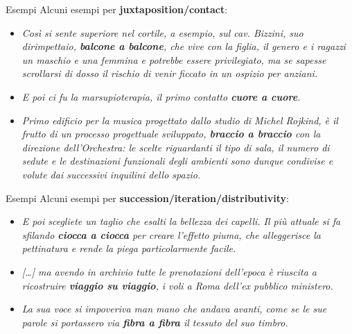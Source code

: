 \documentclass{beamer}
\begin{document}
\begin{frame}{Esempi}
    Alcuni esempi per \textbf{juxtaposition/contact}:
    
    \begin{itemize}
        \item \textit{Così si sente superiore nel cortile, a esempio, sul cav. Bizzini, suo dirimpettaio, \textbf{balcone a balcone}, che vive con la figlia, il genero e i ragazzi un maschio e una femmina e potrebbe essere privilegiato, ma se sapesse scrollarsi di dosso il rischio di venir ficcato in un ospizio per anziani.}
        \item \textit{E poi ci fu la marsupioterapia, il primo contatto \textbf{cuore a cuore}.}
        \item \textit{Primo edificio per la musica progettato dallo studio di Michel Rojkind, è il frutto di un processo progettuale sviluppato, \textbf{braccio a braccio} con la direzione dell'Orchestra: le scelte riguardanti il tipo di sala, il numero di sedute e le destinazioni funzionali degli ambienti sono dunque condivise e volute dai successivi inquilini dello spazio.}
    \end{itemize}
\end{frame}

\begin{frame}{Esempi}
    Alcuni esempi per \textbf{succession/iteration/distributivity}:
    
    \begin{itemize}
        \item \textit{E poi scegliete un taglio che esalti la bellezza dei capelli. Il più attuale si fa sfilando \textbf{ciocca a ciocca} per creare l'effetto piuma, che alleggerisce la pettinatura e rende la piega particolarmente facile.}
        \item \textit{[…] ma avendo in archivio tutte le prenotazioni dell'epoca è riuscita a ricostruire \textbf{viaggio su viaggio}, i voli a Roma dell'ex pubblico ministero.}
        \item \textit{La sua voce si impoveriva man mano che andava avanti, come se le sue parole si portassero via \textbf{fibra a fibra} il tessuto del suo timbro.}
    \end{itemize}
\end{frame}
\end{document}
